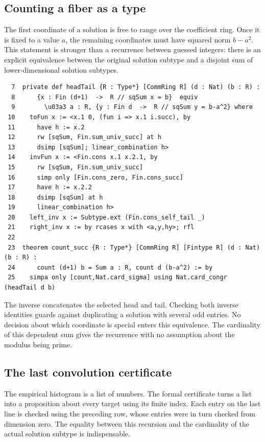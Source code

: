 \documentclass[12pt,letterpaper]{article}
\begin{document}
\clearpage{}\subsection*{Counting a fiber as a type}
The first coordinate of a solution is free to range over the coefficient ring. Once it is fixed to a value $a$, the remaining coordinates must have squared norm $b-a^2$. This statement is stronger than a recurrence between guessed integers: there is an explicit equivalence between the original solution subtype and a disjoint sum of lower-dimensional solution subtypes.
\par
{\fontsize{8.8}{10.5}\selectfont\begin{verbatim}
  7  private def headTail {R : Type*} [CommRing R] (d : Nat) (b : R) :
  8      {x : Fin (d+1)  ->  R // sqSum x = b}  equiv
  9        \u03a3 a : R, {y : Fin d  ->  R // sqSum y = b-a^2} where
 10    toFun x := <x.1 0, (fun i => x.1 i.succ), by
 11      have h := x.2
 12      rw [sqSum, Fin.sum_univ_succ] at h
 13      dsimp [sqSum]; linear_combination h>
 14    invFun x := <Fin.cons x.1 x.2.1, by
 15      rw [sqSum, Fin.sum_univ_succ]
 16      simp only [Fin.cons_zero, Fin.cons_succ]
 17      have h := x.2.2
 18      dsimp [sqSum] at h
 19      linear_combination h>
 20    left_inv x := Subtype.ext (Fin.cons_self_tail _)
 21    right_inv x := by rcases x with <a,y,hy>; rfl
 22  
 23  theorem count_succ {R : Type*} [CommRing R] [Fintype R] (d : Nat) (b : R) :
 24      count (d+1) b = Sum a : R, count d (b-a^2) := by
 25    simpa only [count,Nat.card_sigma] using Nat.card_congr (headTail d b)
\end{verbatim}}
The inverse concatenates the selected head and tail. Checking both inverse identities guards against duplicating a solution with several odd entries. No decision about which coordinate is special enters this equivalence. The cardinality of this dependent sum gives the recurrence with no assumption about the modulus being prime.
\clearpage{}\subsection*{The last convolution certificate}
The empirical histogram is a list of numbers. The formal certificate turns a list into a proposition about every target using its finite index. Each entry on the last line is checked using the preceding row, whose entries were in turn checked from dimension zero. The equality between this recursion and the cardinality of the actual solution subtype is indispensable.
\end{document}
